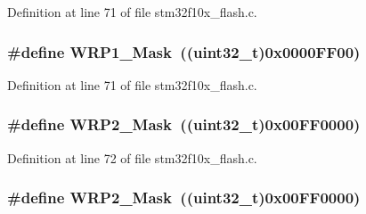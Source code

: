 Definition at line 71 of file stm32f10x\+\_\+flash.\+c.

\subsubsection[{\texorpdfstring{W\+R\+P1\+\_\+\+Mask}{WRP1_Mask}}]{\setlength{\rightskip}{0pt plus 5cm}\#define W\+R\+P1\+\_\+\+Mask~(({\bf uint32\+\_\+t})0x0000\+F\+F00)}\hypertarget{group___f_l_a_s_h___private___defines_gaa2b2535ba91736dd2d6baa92068686e0}{}\label{group___f_l_a_s_h___private___defines_gaa2b2535ba91736dd2d6baa92068686e0}


Definition at line 71 of file stm32f10x\+\_\+flash.\+c.

\subsubsection[{\texorpdfstring{W\+R\+P2\+\_\+\+Mask}{WRP2_Mask}}]{\setlength{\rightskip}{0pt plus 5cm}\#define W\+R\+P2\+\_\+\+Mask~(({\bf uint32\+\_\+t})0x00\+F\+F0000)}\hypertarget{group___f_l_a_s_h___private___defines_ga4676f67c7be97a09eb1c6a5753ce0523}{}\label{group___f_l_a_s_h___private___defines_ga4676f67c7be97a09eb1c6a5753ce0523}


Definition at line 72 of file stm32f10x\+\_\+flash.\+c.

\subsubsection[{\texorpdfstring{W\+R\+P2\+\_\+\+Mask}{WRP2_Mask}}]{\setlength{\rightskip}{0pt plus 5cm}\#define W\+R\+P2\+\_\+\+Mask~(({\bf uint32\+\_\+t})0x00\+F\+F0000)}\hypertarget{group___f_l_a_s_h___private___defines_ga4676f67c7be97a09eb1c6a5753ce0523}{}\label{group___f_l_a_s_h___private___defines_ga4676f67c7be97a09eb1c6a5753ce0523}


